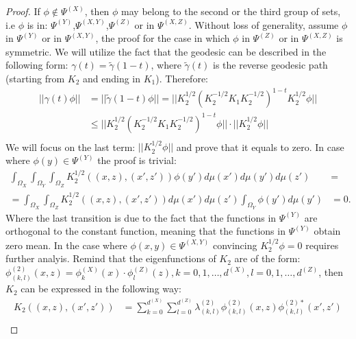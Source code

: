 \documentclass[]{article}
\theoremstyle{definition}
\begin{document}
	\begin{proof}
		If $\phi \notin \Psi^{(X)}$, then $\phi$ may belong to the second or the third group of sets, i.e $\phi$ is in: $\Psi^{(Y)}$,$\Psi^{(X,Y)}$,$\Psi^{(Z)}$ or in $\Psi^{(X,Z)}$.
		Without loss of generality, assume $\phi$ in $\Psi^{(Y)}$ or in $\Psi^{(X,Y)}$, the proof for the case in which $\phi$ in $\Psi^{(Z)}$ or in $\Psi^{(X,Z)}$ is symmetric.
		We will utilize the fact that the geodesic can be described in the following form: $\gamma(t)=\tilde{\gamma}(1-t)$, where $\tilde{\gamma}(t)$ is the reverse geodesic path (starting from $K_2$ and ending in $K_1$). Therefore:
		\begin{equation}
		\label{eq:CSeq}
		\begin{aligned}
				||\gamma(t) \phi|| &= ||\tilde{\gamma}(1-t) \phi|| = || K_2^{1/2}(K_2^{-1/2}K_1K_2^{-1/2})^{1-t}K_2^{1/2} \phi|| \\ &\leq  || K_2^{1/2}(K_2^{-1/2}K_1K_2^{-1/2})^{1-t} \phi || \cdot ||K_2^{1/2}\phi|| \\
		\end{aligned}
		\end{equation}  
	   We will focus on the last term: $||K_2^{1/2}\phi||$ and prove that it equals to zero.
	   In case where $\phi(y) \in \Psi^{(Y)}$ the proof is trivial:
	   \begin{equation}
	   \begin{aligned}
	   \int_{\Omega_X}\int_{\Omega_Y}\int_{\Omega_Z} K_2^{1/2}((x,z),(x',z')) \phi(y') d\mu(x')d\mu(y')d\mu(z') &= \\
	   =\int_{\Omega_X}\int_{\Omega_Z} K_2^{1/2}((x,z),(x',z'))d\mu(x')d\mu(z') \int_{\Omega_Y}\phi(y')d\mu(y') &= 0.
	   \end{aligned}
	   \end{equation}
	   Where the last transition is due to the fact that the functions in $\Psi^{(Y)}$ are orthogonal to the constant function, meaning that the functions in $\Psi^{(Y)}$ obtain zero mean.
	   In the case where $\phi(x,y) \in \Psi^{(X,Y)}$ convincing $K_2^{1/2}\phi=0$ requires further analyis.
	   Remind that the eigenfunctions of $K_2$ are of the form: $\phi^{(2)}_{(k,l)}(x,z) = \phi^{(X)}_k(x) \cdot \phi^{(Z)}_l(z), k=0,1,\ldots,d^{(X)}, l=0,1,\ldots,d^{(Z)}$, then $K_2$ can be expressed in the following way: 
	   \begin{equation}
	   \begin{aligned}
	    K_2 ((x,z),(x',z')) & = \sum_{k=0}^{d^{(X)}} \sum_{l=0}^{d^{(Z)}} \lambda^{(2)}_{(k,l)} \phi^{(2)}_{(k,l)}(x,z) \phi^{(2)*}_{(k,l)}(x',z') \\ 

\end{aligned}
\end{equation}
\end{proof}
\end{document}
